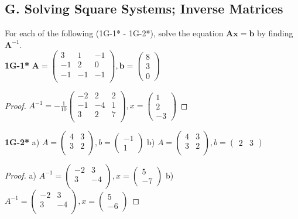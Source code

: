 \documentclass{article}
\begin{document}
\subsection{G. Solving Square Systems; Inverse Matrices}
For each of the following (1G-1* - 1G-2*), solve the equation $\mathbf{Ax} = \mathbf{b}$ by finding $\mathbf{A}^{-1}$.
%
%
\\\textbf{1G-1*}
$
\mathbf{A} =
\begin{pmatrix}
3 & 1 & -1 \\
-1 & 2 & 0 \\
-1 & -1 & -1 \\
\end{pmatrix}
,
\mathbf{b} =
\begin{pmatrix}
8 \\ 3 \\ 0
\end{pmatrix}
$
%
%
\begin{proof}
$
A^{-1} = -\frac{1}{10}
\begin{pmatrix}
-2 & 2 & 2 \\
-1 & -4 & 1 \\
3 & 2 & 7 \\
\end{pmatrix}
,
x = \begin{pmatrix}
1 \\ 2 \\ -3
\end{pmatrix}
$
\end{proof}
%
%
\textbf{1G-2*} a) 
$
A = \begin{pmatrix}
4 & 3 \\
3 & 2 \\
\end{pmatrix}
,
b = \begin{pmatrix}
-1 \\ 1
\end{pmatrix}
$
b)
$
A = 
\begin{pmatrix}
4 & 3 \\
3 & 2 \\
\end{pmatrix}
,
b = \begin{pmatrix}
2 & 3
\end{pmatrix}
$
%
%
\begin{proof}
a) $A^{-1} = \begin{pmatrix}
-2 & 3 \\
3 & -4 \\
\end{pmatrix}
,
x = \begin{pmatrix}
5 \\ -7
\end{pmatrix}
$
b) $A^{-1} = \begin{pmatrix}
-2 & 3 \\
3 & -4 \\
\end{pmatrix}
,
x = \begin{pmatrix}
5 \\ -6
\end{pmatrix}
$
\end{proof}
\end{document}
